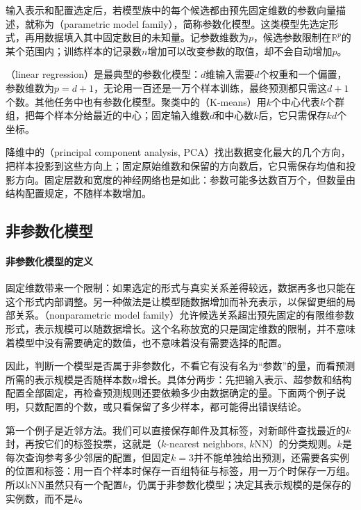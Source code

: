 输入表示和配置选定后，若模型族中的每个候选都由预先固定维数的参数向量描述，就称为（parametric model family），简称参数化模型。这类模型先选定形式，再用数据填入其中固定数目的未知量。记参数维数为$p$，候选参数限制在$\mathbb{R}^{p}$的某个范围内；训练样本的记录数$n$增加可以改变参数的取值，却不会自动增加$p$。

（linear regression）是最典型的参数化模型：$d$维输入需要$d$个权重和一个偏置，参数维数为$p=d+1$，无论用一百还是一万个样本训练，最终预测都只需这$d+1$个数。其他任务中也有参数化模型。聚类中的（K-means）用$k$个中心代表$k$个群组，把每个样本分给最近的中心；固定输入维数$d$和中心数$k$后，它只需保存$kd$个坐标。

降维中的（principal component analysis, PCA）找出数据变化最大的几个方向，把样本投影到这些方向上；固定原始维数和保留的方向数后，它只需保存均值和投影方向。固定层数和宽度的神经网络也是如此：参数可能多达数百万个，但数量由结构配置规定，不随样本数增加。

\subsection{非参数化模型}
\label{sec:models-nonparametric}

\paragraph{非参数化模型的定义}

固定维数带来一个限制：如果选定的形式与真实关系差得较远，数据再多也只能在这个形式内部调整。另一种做法是让模型随数据增加而补充表示，以保留更细的局部关系。（nonparametric model family）允许候选关系超出预先固定的有限维参数形式，表示规模可以随数据增长。这个名称放宽的只是固定维数的限制，并不意味着模型中没有需要确定的数值，也不意味着没有需要选择的配置。

因此，判断一个模型是否属于非参数化，不看它有没有名为“参数”的量，而看预测所需的表示规模是否随样本数$n$增长。具体分两步：先把输入表示、超参数和结构配置全部固定，再检查预测规则还要依赖多少由数据确定的量。下面两个例子说明，只数配置的个数，或只看保留了多少样本，都可能得出错误结论。

第一个例子是近邻方法。我们可以直接保存邮件及其标签，对新邮件查找最近的$k$封，再按它们的标签投票，这就是（$k$-nearest neighbors, $k$NN）的分类规则。$k$是每次查询参考多少邻居的配置，但固定$k=3$并不能单独给出预测，还需要各实例的位置和标签：用一百个样本时保存一百组特征与标签，用一万个时保存一万组。所以kNN虽然只有一个配置$k$，仍属于非参数化模型；决定其表示规模的是保存的实例数，而不是$k$。

